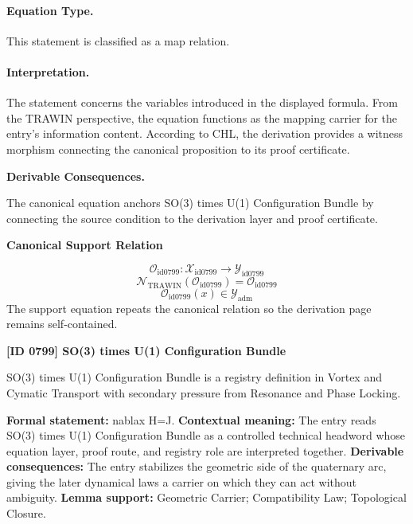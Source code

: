\paragraph{Equation Type.}
This statement is classified as a map relation.

\paragraph{Interpretation.}
The statement concerns the variables introduced in the displayed formula. From the TRAWIN perspective, the equation functions as the mapping carrier for the entry’s information content. According to CHL, the derivation provides a witness morphism connecting the canonical proposition to its proof certificate.

\par\vspace{0.35em}
\noindent\textbf{Derivable Consequences.}\quad
\begingroup
\footnotesize
\raggedright
The canonical equation anchors SO(3) times U(1) Configuration Bundle by connecting the source condition to the derivation layer and proof certificate.
\par\endgroup

\noindent\textbf{Canonical Support Relation}\par
\[
\mathcal{O}_{\mathrm{id0799}}:\mathcal{X}_{\mathrm{id0799}}\longrightarrow\mathcal{Y}_{\mathrm{id0799}}
\]
\[
\mathcal{N}_{\mathrm{TRAWIN}}(\mathcal{O}_{\mathrm{id0799}})=\mathcal{O}_{\mathrm{id0799}}
\]
\[
\mathcal{O}_{\mathrm{id0799}}(x)\in\mathcal{Y}_{\mathrm{adm}}
\]
\noindent The support equation repeats the canonical relation so the derivation page remains self-contained.\par

\clearpage
\noindent\textbf{[ID 0799] SO(3) times U(1) Configuration Bundle}\par
\vspace{0.35em}
\begingroup\small
{}
SO(3) times U(1) Configuration Bundle is a registry definition in Vortex and Cymatic Transport with secondary pressure from Resonance and Phase Locking.

\begingroup\footnotesize\setlength{\emergencystretch}{3em}\sloppy
\textbf{Formal statement:} nablax H=J. \textbf{Contextual meaning:} The entry reads SO(3) times U(1) Configuration Bundle as a controlled technical headword whose equation layer, proof route, and registry role are interpreted together. \textbf{Derivable consequences:} The entry stabilizes the geometric side of the quaternary arc, giving the later dynamical laws a carrier on which they can act without ambiguity. \textbf{Lemma support:} Geometric Carrier; Compatibility Law; Topological Closure.\par
\endgroup

